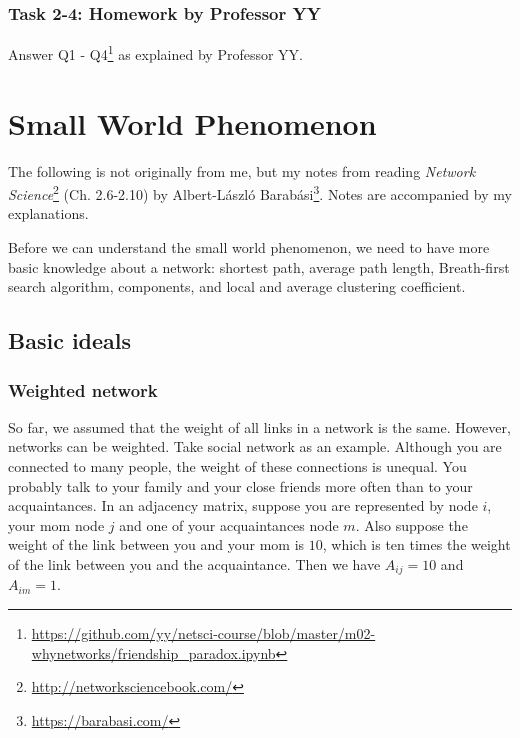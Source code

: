 \documentclass[
]{krantz}
\makeatletter
\renewcommand{\href}[2]{#2\footnote{\url{#1}}}
\newenvironment{kframe}{%
\medskip{}
\setlength{\fboxsep}{.8em}
 \def\at@end@of@kframe{}%
 \ifinner\ifhmode%
  \def\at@end@of@kframe{\end{minipage}}%
  \begin{minipage}{\columnwidth}%
 \fi\fi%
 \def\FrameCommand##1{\hskip\@totalleftmargin \hskip-\fboxsep
 \colorbox{shadecolor}{##1}\hskip-\fboxsep
     \hskip-\linewidth \hskip-\@totalleftmargin \hskip\columnwidth}%
 \MakeFramed {\advance\hsize-\width
   \@totalleftmargin\z@ \linewidth\hsize
   \@setminipage}}%
 {\par\unskip\endMakeFramed%
 \at@end@of@kframe}
\newenvironment{rmdblock}[1]
  {
  \begin{itemize}
  \renewcommand{\labelitemi}{
    \raisebox{-.7\height}[0pt][0pt]{
      {\setkeys{Gin}{width=3em,keepaspectratio}\texttt{[image: images/\#1]}}
    }
  }
  \setlength{\fboxsep}{1em}
  \begin{kframe}
  \item
  }
  {
  \end{kframe}
  \end{itemize}
  }
\newenvironment{rmdnote}
  {\begin{rmdblock}{note}}
  {\end{rmdblock}}
\makeatother
\begin{document}
\hypertarget{task-2-4-homework-by-professor-yy}{%
\subsection{Task 2-4: Homework by Professor YY}\label{task-2-4-homework-by-professor-yy}}

Answer \href{https://github.com/yy/netsci-course/blob/master/m02-whynetworks/friendship_paradox.ipynb}{Q1 - Q4} as explained by Professor YY.

\hypertarget{SmallWorld}{%
\chapter{Small World Phenomenon}\label{SmallWorld}}

\begin{rmdnote}
The following is not originally from me, but my notes from reading \href{http://networksciencebook.com/}{\emph{Network Science}} (Ch. 2.6-2.10) by \href{https://barabasi.com/}{Albert-László Barabási}. Notes are accompanied by my explanations.
\end{rmdnote}

Before we can understand the small world phenomenon, we need to have more basic knowledge about a network: shortest path, average path length, Breath-first search algorithm, components, and local and average clustering coefficient.

\hypertarget{basic-ideals}{%
\section{Basic ideals}\label{basic-ideals}}

\hypertarget{weighted-network}{%
\subsection{Weighted network}\label{weighted-network}}

So far, we assumed that the weight of all links in a network is the same. However, networks can be weighted. Take social network as an example. Although you are connected to many people, the weight of these connections is unequal. You probably talk to your family and your close friends more often than to your acquaintances. In an adjacency matrix, suppose you are represented by node \(i\), your mom node \(j\) and one of your acquaintances node \(m\). Also suppose the weight of the link between you and your mom is \(10\), which is ten times the weight of the link between you and the acquaintance. Then we have \(A_{ij} = 10\) and \(A_{im} = 1\).
\end{document}
